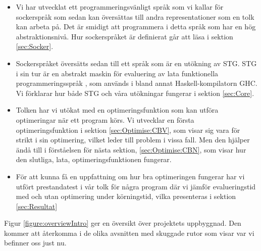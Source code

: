 \documentclass[Rapport]{subfiles}
\begin{document}
\begin{itemize}
    \item Vi har utvecklat ett programmeringsvänligt språk som vi kallar för sockerspråk
          som sedan kan översättas till andra representationer som en tolk kan arbeta på. Det
          är smidigt att programmera i detta språk som har en hög abstraktionsnivå. Hur sockerspråket är definierat
          går att läsa i sektion \ref{sec:Socker}.
          
    \item Sockerspråket översätts sedan till ett språk som är en utökning 
          av STG. STG i sin tur är en abstrakt maskin för evaluering av
          lata funktionella programmeringsspråk \cite{stg}, som används i bland annat
          Haskell-kompilatorn GHC. Vi förklarar hur både STG och våra utökningar
          fungerar i sektion \ref{sec:Core}.
    
    \item Tolken har vi utökat med en optimeringsfunktion som kan utföra optimeringar
          när ett program körs. Vi utvecklar en första optimeringsfunktion i sektion
          \ref{sec:Optimise:CBV}, som visar sig vara för strikt i sin optimering,
          vilket leder till problem i vissa fall. Men den hjälper ändå till
          i förståelsen för nästa sektion, \ref{sec:Optimise:CBN}, som visar hur
          den slutliga, lata, optimeringsfunktionen fungerar.
    
    \item För att kunna få en uppfattning om hur bra optimeringen fungerar har
          vi utfört prestandatest i vår tolk för några program där vi jämför
          evalueringstid med och utan optimering under körningstid, 
          vilka presenteras i sektion \ref{sec:Resultat}
    
\end{itemize}

Figur \ref{figure:overviewIntro} ger en översikt över projektets uppbyggnad. Den kommer
att återkomma i de olika avsnitten med skuggade rutor som visar var
vi befinner oss just nu.

\overviewIntro


\begin{comment}
Olles text rör ej :'/
För att kunna göra det här arbetet krävs det ett programmeringsspråk
att arbeta i. Vi har skapat en tolk efter STG, som är en modell för hur
ett funktionellt språk kan evalueras. Haskellkompilatorn GHC använder sig
till exempel av STG som ett steg i kompileringen. Ett program som representeras
med STG-kod är evalueringsvänligt, men inte särskilt programmerarvänligt,
varför vi också har skapat ett språk till - sockerspråket -
som är lättare att programmera i och mer liknar andra funktionella
språk som exempelvis Haskell. Sockerspråket kan sedan översättas till
STG-representationen och evalueras i tolken.
\end{comment}
\end{document}
